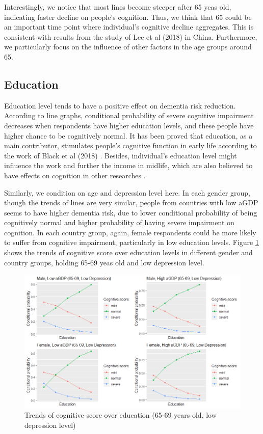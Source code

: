 \documentclass[11pt,twoside]{article}
\numberwithin{Theorem}{section}
\numberwithin{Definition}{section}
\numberwithin{Lemma}{section}
\numberwithin{Algorithm}{section}
\numberwithin{equation}{section}
\begin{document}
Interestingly, we notice that most lines become steeper after 65 yeas old, indicating faster decline on people's cognition. Thus, we think that 65 could be an important time point where individual's cognitive decline aggregates. This is consistent with results from the study of Lee et al (2018) \cite{lee2018association} in China. Furthermore, we particularly focus on the influence of other factors in the age groups around 65.

\subsection {Education}

Education level tends to have a positive effect on dementia risk reduction. According to line graphs, conditional probability of severe cognitive impairment decreases when respondents have higher education levels, and these people have higher chance to be cognitively normal. It has been proved that education, as a main contributor, stimulates people's cognitive function in early life according to the work of Black et al (2018) \cite{blacker2018brain}. Besides, individual's education level might influence the work and further the income in midlife, which are also believed to have effects on cognition in other researches \cite{livingston2017dementia}.

Similarly, we condition on age and depression level here. In each gender group, though the trends of lines are very similar, people from countries with low aGDP seems to have higher dementia risk, due to lower conditional probability of being cognitively normal and higher probability of having severe impairment on cognition. In each country group, again, female respondents could be more likely to suffer from cognitive impairment, particularly in low education levels. Figure \ref{fig:edu1} shows the trends of cognitive score over education levels in different gender and country groups, holding 65-69 yeas old and low depression level.

\begin{figure}[!h]
	\centering
	\includegraphics[width = \textwidth]{Images/edu1.png}
	\caption{Trends of cognitive score over education (65-69 years old, low depression level)}
	\label{fig:edu1}
\end{figure}
\end{document}
